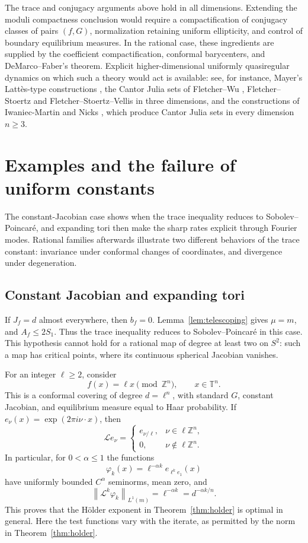 \documentclass[10pt,a4paper]{amsart}
\newcommand{\T}{\mathbb T}
\newcommand{\Lop}{\mathcal L}
\newcommand{\norm}[1]{\left\lVert #1\right\rVert}
\numberwithin{equation}{section}
\begin{document}
The trace and conjugacy arguments above hold in all dimensions. Extending the moduli compactness conclusion would require a compactification of conjugacy classes of pairs $(f,G)$, normalization retaining uniform ellipticity, and control of boundary equilibrium measures. In the rational case, these ingredients are supplied by the coefficient compactification, conformal barycenters, and DeMarco--Faber's theorem. Explicit higher-dimensional uniformly quasiregular dynamics on which such a theory would act is available: see, for instance, Mayer's Latt\`es-type constructions \cite{May97}, the Cantor Julia sets of Fletcher--Wu \cite{FW15}, Fletcher--Stoertz \cite{FS22} and Fletcher--Stoertz--Vellis \cite{FSV} in three dimensions, and the constructions of Iwaniec-Martin \cite{IM96} and Nicks \cite{Nic26}, which produce Cantor Julia sets in every dimension $n\ge3$.

\section{Examples and the failure of uniform constants}\label{sec:examples}

The constant-Jacobian case shows when the trace inequality reduces to Sobolev--Poincar\'e, and expanding tori then make the sharp rates explicit through Fourier modes. Rational families afterwards illustrate two different behaviors of the trace constant: invariance under conformal changes of coordinates, and divergence under degeneration.

\subsection{Constant Jacobian and expanding tori}\label{subsec:tori}

If $J_f=d$ almost everywhere, then $b_f=0$. Lemma~\ref{lem:telescoping} gives $\mu=m$, and $A_f\le2S_1$. Thus the trace inequality reduces to Sobolev--Poincar\'e in this case. This hypothesis cannot hold for a rational map of degree at least two on $S^2$: such a map has critical points, where its continuous spherical Jacobian vanishes.

For an integer $\ell\ge2$, consider
\[
 f(x)=\ell x\pmod{\mathbb Z^n},\qquad x\in\T^n.
\]
This is a conformal covering of degree $d=\ell^n$, with standard $G$, constant Jacobian, and equilibrium measure equal to Haar probability. If $e_\nu(x)=\exp(2\pi i\nu\cdot x)$, then
\[
 \Lop e_\nu=
 \begin{cases}
 e_{\nu/\ell},&\nu\in\ell\mathbb Z^n,\\
 0,&\nu\notin\ell\mathbb Z^n.
 \end{cases}
\]
In particular, for $0<\alpha\le1$ the functions
\[
 \varphi_k(x)=\ell^{-\alpha k}e_{\ell^k e_1}(x)
\]
have uniformly bounded $C^\alpha$ seminorms, mean zero, and
\[
 \norm{\Lop^k\varphi_k}_{L^1(m)}
 =\ell^{-\alpha k}=d^{-\alpha k/n}.
\]
This proves that the H\"older exponent in Theorem~\ref{thm:holder} is optimal in general. Here the test functions vary with the iterate, as permitted by the norm in Theorem~\ref{thm:holder}.
\end{document}
